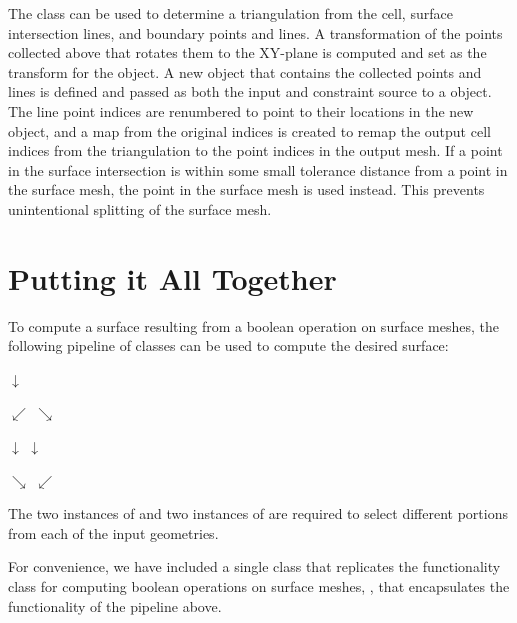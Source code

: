 \documentclass{InsightArticle}
\begin{document}
The  class can be used to determine a triangulation from the cell, surface intersection lines, and boundary points and lines. A transformation of the points collected above that rotates them to the XY-plane is computed and set as the transform for the  object. A new  object that contains the collected points and lines is defined and passed as both the input and constraint source to a  object. The line point indices are renumbered to point to their locations in the new  object, and a map from the original indices is created to remap the output cell indices from the triangulation to the point indices in the output mesh. If a point in the surface intersection is within some small tolerance distance from a point in the surface mesh, the point in the surface mesh is used instead. This prevents unintentional splitting of the surface mesh.

\section{Putting it All Together}

To compute a surface resulting from a boolean operation on surface meshes, the following pipeline of classes can be used to compute the desired surface: 

\begin{center}

$\downarrow$


$\swarrow$ \hspace{3em} $\searrow$

 

$\downarrow$ \hspace{5em}  $\downarrow$

 

$\searrow$ \hspace{3em} $\swarrow$

\end{center}

The two instances of  and two instances of  are required to select different portions from each of the input geometries.

For convenience, we have included a single class that replicates the functionality  class for computing boolean operations on surface meshes, , that encapsulates the functionality of the pipeline above.
\end{document}
